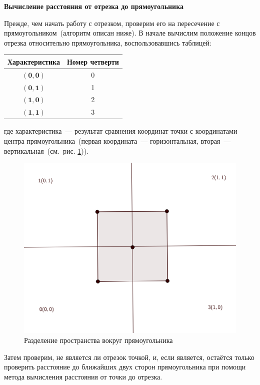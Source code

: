 \textbf{Вычисление расстояния от отрезка до прямоугольника}

Прежде, чем начать работу с отрезком, проверим его на пересечение с прямоугольником~(алгоритм описан ниже).
В начале вычислим положение концов отрезка относительно прямоугольника, воспользовавшись таблицей:
\begin{center}
\begin{tabular}{|c|c|}
\hline
Характеристика & Номер четверти \\
\hline 
$(\mathbf{0},\mathbf{0})$ & 0 \\ 
\hline 
$(\mathbf{0},\mathbf{1})$ & 1 \\
\hline
$(\mathbf{1},\mathbf{0})$ & 2 \\
\hline
$(\mathbf{1},\mathbf{1})$ & 3 \\
\hline
\end{tabular} 
\end{center}
где характеристика~--- результат сравнения координат точки с  координатами центра прямоугольника~(первая координата~--- горизонтальная, вторая~--- вертикальная\, (см.~рис. \ref{fig:conv_rect})).
\begin{figure}[ht!]
\begin{center}
\includegraphics[scale=0.4]{images/conv_rect}
\end{center}
\vspace*{-8mm}
\caption{Разделение пространства вокруг прямоугольника}\label{fig:conv_rect}
\end{figure}

Затем проверим, не является ли отрезок точкой, и, если является, остаётся только проверить расстояние до ближайших двух сторон прямоугольника при помощи метода вычисления расстояния от точки до отрезка.

